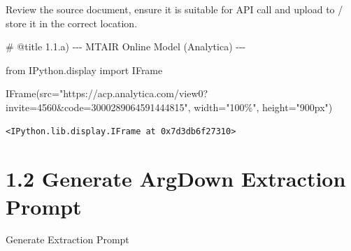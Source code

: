 \documentclass[
  11pt,
  letterpaper,
]{book}
\newenvironment{Shaded}{\begin{snugshade}}{\end{snugshade}}
\newcommand{\CommentTok}[1]{\textcolor[rgb]{0.37,0.37,0.37}{#1}}
\newcommand{\ImportTok}[1]{\textcolor[rgb]{0.00,0.46,0.62}{#1}}
\newcommand{\NormalTok}[1]{\textcolor[rgb]{0.00,0.23,0.31}{#1}}
\newcommand{\OperatorTok}[1]{\textcolor[rgb]{0.37,0.37,0.37}{#1}}
\newcommand{\StringTok}[1]{\textcolor[rgb]{0.13,0.47,0.30}{#1}}
\begin{document}
Review the source document, ensure it is suitable for API call and
upload to / store it in the correct location.

\begin{Shaded}
\begin{Highlighting}[]
\CommentTok{\# @title 1.1.a) {-}{-}{-} MTAIR Online Model (Analytica) {-}{-}{-}}

\ImportTok{from}\NormalTok{ IPython.display }\ImportTok{import}\NormalTok{ IFrame}

\NormalTok{IFrame(src}\OperatorTok{=}\StringTok{"https://acp.analytica.com/view0?invite=4560\&code=3000289064591444815"}\NormalTok{, width}\OperatorTok{=}\StringTok{"100\%"}\NormalTok{, height}\OperatorTok{=}\StringTok{"900px"}\NormalTok{)}
\end{Highlighting}
\end{Shaded}

\begin{verbatim}
<IPython.lib.display.IFrame at 0x7d3db6f27310>
\end{verbatim}

\section{1.2 Generate ArgDown Extraction
Prompt}\label{generate-argdown-extraction-prompt}

Generate Extraction Prompt
\end{document}
